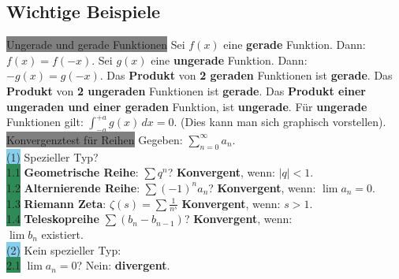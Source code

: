 \documentclass[landscape, 10pt]{article}
\begin{document}
\begin{multicols}{3}
\section{Wichtige Beispiele}
       \colorbox{gray}{Ungerade und gerade Funktionen} Sei \textcolor{NavyBlue}{$f(x)$}
              eine \textbf{gerade} Funktion. Dann: \textcolor{NavyBlue}{$f(x)=f(-x)$}.
              Sei \textcolor{NavyBlue}{$g(x)$} eine \textbf{ungerade} 
              Funktion. Dann: \textcolor{NavyBlue}{$-g(x)=g(-x)$}.
              Das \textbf{Produkt} von \textbf{2 geraden} Funktionen 
              ist \textbf{gerade}. Das \textbf{Produkt} von \textbf{2 
              ungeraden}
              Funktionen ist \textbf{gerade}. Das \textbf{Produkt einer 
              ungeraden und einer geraden} Funktion,
              ist \textbf{ungerade}.
              Für \textbf{ungerade} Funktionen gilt:
              \textcolor{NavyBlue}{$\int_{-a}^{+a}g(x)\,dx=0$}. (Dies kann man sich
              graphisch vorstellen).\\
       \colorbox{gray}{Konvergenztest für Reihen}
              Gegeben: \textcolor{NavyBlue}{$\sum_{n=0}^\infty a_n$}.\\
       \colorbox{SkyBlue}{(1)} Spezieller Typ?\\
              \colorbox{SeaGreen}{1.1} \textbf{Geometrische Reihe}: 
                     \textcolor{NavyBlue}{$\sum q^n$}? 
                     \textbf{Konvergent}, 
                     wenn: \textcolor{NavyBlue}{$|q|<1$}.\\
              \colorbox{SeaGreen}{1.2} \textbf{Alternierende Reihe}: 
                     \textcolor{NavyBlue}{$\sum(-1)^na_n$}? 
                     \textbf{Konvergent}, wenn:
                     \textcolor{NavyBlue}{$\lim a_n=0$}.\\
              \colorbox{SeaGreen}{1.3} \textbf{Riemann Zeta}: 
                     \textcolor{NavyBlue}{$\zeta(s)=\sum\frac{1}{n^s}$} 
                     \textbf{Konvergent}, wenn: \textcolor{NavyBlue}{$s>1$}.\\
              \colorbox{SeaGreen}{1.4} \textbf{Teleskopreihe} 
                     \textcolor{NavyBlue}{$\sum(b_n-b_{n-1})$}? 
                     \textbf{Konvergent}, wenn:\\
              \textcolor{NavyBlue}{$\lim b_n$} existiert.\\
       \colorbox{SkyBlue}{(2)} Kein spezieller Typ:\\
              \colorbox{SeaGreen}{2.1} \textcolor{NavyBlue}{$\lim a_n=0$}? 
                     Nein: \textbf{divergent}.\\

\end{multicols}
\end{document}
